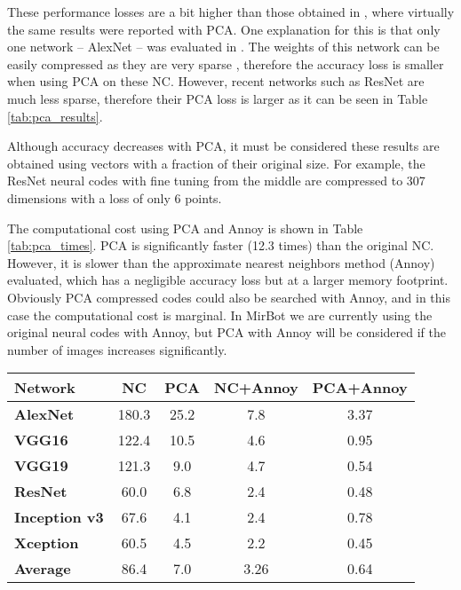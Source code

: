\documentclass[final, twocolumn]{elsarticle}
\begin{document}
These performance losses are a bit higher than those obtained in \cite{BabenkoSCL14}, where virtually the same results were reported with PCA. One explanation for this is that only one network -- AlexNet \cite{Krizhevsky2012ImageNetNetworks} -- was evaluated in \cite{BabenkoSCL14}. The weights of this network can be easily compressed as they are very sparse \cite{Sparse}, therefore  the accuracy loss is smaller when using PCA on these NC. However, recent networks such as ResNet are much less sparse, therefore their PCA loss is larger as it can be seen in Table \ref{tab:pca_results}.

Although accuracy decreases with PCA, it must be considered these results are obtained using vectors with a fraction of their original size. For example, the ResNet neural codes with fine tuning from the middle are compressed to 307 dimensions with a loss of only 6 points.

The computational cost using PCA and Annoy is shown in Table \ref{tab:pca_times}. PCA is significantly faster (12.3 times) than the original NC. However, it is slower than the approximate nearest neighbors method (Annoy) evaluated, which has a negligible accuracy loss but at a larger memory footprint. Obviously PCA compressed codes could also be searched with Annoy, and in this case the computational cost is marginal. In MirBot we are currently using the original neural codes with Annoy, but PCA with Annoy will be considered if the number of images increases significantly. %



\begin{table*}
\centering
\footnotesize

\begin{tabular}{lcccc}
\hline
\textbf{Network}      & \textbf{NC} & \textbf{PCA} & \textbf{NC+Annoy} & \textbf{PCA+Annoy} \\ \hline
\textbf{AlexNet}      & 180.3  & 25.2  & 7.8 & 3.37  \\ %
\textbf{VGG16}        & 122.4  & 10.5   & 4.6 & 0.95          \\
\textbf{VGG19}        & 121.3  & 9.0    & 4.7 & 0.54          \\
\textbf{ResNet}       & 60.0  & 6.8     & 2.4 & 0.48            \\
\textbf{Inception v3} & 67.6   & 4.1    & 2.4 & 0.78         \\
\textbf{Xception}     & 60.5    & 4.5 &  2.2  & 0.45         \\ \hline
\textbf{Average}      & 86.4   & 7.0   &  3.26  & 0.64    \\ \hline
\end{tabular}

\caption{Comparison of the average time in milliseconds to search a query with NC, compressed PCA (brute-force, 4 threads), Annoy (single thread) with the original NC, and Annoy (single thread) with the PCA compressed codes.}
\label{tab:pca_times}
\end{table*}
\end{document}
